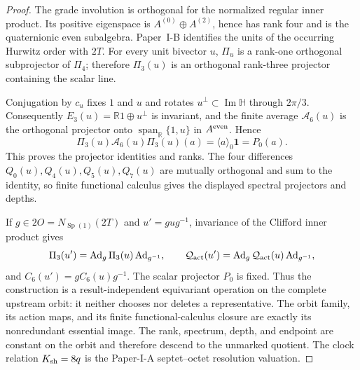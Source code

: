\documentclass[12pt,a4paper]{article}
\begin{document}
\begin{proof}
The grade involution is orthogonal for the normalized regular inner product.
Its positive eigenspace is \(A^{(0)}\oplus A^{(2)}\), hence has rank four and
is the quaternionic even subalgebra.  Paper~I-B identifies the units of the
occurring Hurwitz order with \(2T\).  For every unit bivector \(u\),
\(\Pi_u\) is a rank-one orthogonal subprojector of \(\Pi_4\); therefore
\(\Pi_3(u)\) is an orthogonal rank-three projector containing the scalar line.

Conjugation by \(c_u\) fixes \(1\) and \(u\) and rotates
\(u^\perp\subset\operatorname{Im}\mathbb H\) through \(2\pi/3\).
Consequently \(E_3(u)=\mathbb R1\oplus u^\perp\) is invariant, and the finite
average \(\mathcal A_6(u)\) is the orthogonal projector onto
\(\operatorname{span}_{\mathbb R}\{1,u\}\) in \(A^{\rm even}\).  Hence
\[
 \Pi_3(u)\mathcal A_6(u)\Pi_3(u)(a)
 =\langle a\rangle_0\mathbf1=P_0(a).
\]
This proves the projector identities and ranks.  The four differences
\(Q_0(u),\allowbreak Q_4(u),\allowbreak Q_5(u),\allowbreak Q_7(u)\) are mutually orthogonal and sum to the
identity, so finite functional calculus gives the displayed spectral
projectors and depths.

If \(g\in2O=N_{\operatorname{Sp}(1)}(2T)\) and \(u'=gug^{-1}\), invariance of the Clifford
inner product gives
\[
 \Pi_3(u')=\operatorname{Ad}_g\Pi_3(u)\operatorname{Ad}_{g^{-1}},
 \qquad
 \mathcal Q_{\rm act}(u')
 =\operatorname{Ad}_g\mathcal Q_{\rm act}(u)\operatorname{Ad}_{g^{-1}},
\]
and \(C_6(u')=gC_6(u)g^{-1}\).  The scalar projector \(P_0\) is fixed.
Thus the construction is a result-independent equivariant operation on the
complete upstream orbit: it neither chooses nor deletes a representative.
The orbit family, its action maps, and its finite functional-calculus closure
are exactly its nonredundant essential image.  The rank, spectrum, depth, and
endpoint are constant on the orbit and therefore descend to the unmarked
quotient.  The clock relation \(K_{\rm sh}=8q\) is the Paper-I-A
septet--octet resolution valuation.
\end{proof}
\end{document}
